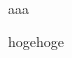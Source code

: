 \documentclass[uplatex]{jsarticle}
\title{
	\gt{title}\\
}
\author{
	\gt{○○大学 ○○学科 ○○専攻 学籍番号 名前}\\
}
\date{}
\begin{document}
\maketitle

aaa\cite{yamada}

hogehoge

\printbibliography[title=参考文献]
\end{document}
